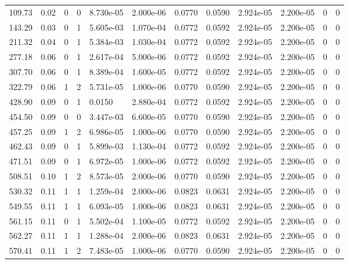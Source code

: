 \documentclass[preview]{standalone}
\begin{document}
{{\begin{tabular}{L{1.2cm}C{1.2cm} C{0.3cm}C{0.5cm} C{1.4cm}C{1.4cm} C{1.4cm}C{1.4cm} C{1.6cm}C{1.6cm} C{1.6cm}C{1.6cm}}
  109.73  &  0.02  & 0     &  0 &  8.730e-05  & 2.000e-06  &  0.0770&   0.0590& 2.924e-05 & 2.200e-05   &  0 & 0  \\ 
  143.29  &  0.03  & 0     &  1 &  5.605e-03  & 1.070e-04  &  0.0772&   0.0592& 2.924e-05 & 2.200e-05   &  0 & 0  \\ 
  211.32  &  0.04  & 0     &  1 &  5.384e-03  & 1.030e-04  &  0.0772&   0.0592& 2.924e-05 & 2.200e-05   &  0 & 0  \\ 
  277.18  &  0.06  & 0     &  1 &  2.617e-04  & 5.000e-06  &  0.0772&   0.0592& 2.924e-05 & 2.200e-05   &  0 & 0  \\ 
  307.70  &  0.06  & 0     &  1 &  8.389e-04  & 1.600e-05  &  0.0772&   0.0592& 2.924e-05 & 2.200e-05   &  0 & 0  \\ 
  322.79  &  0.06  & 1     &  2 &  5.731e-05  & 1.000e-06  &  0.0770&   0.0590& 2.924e-05 & 2.200e-05   &  0 & 0  \\ 
  428.90  &  0.09  & 0     &  1 &  0.0150  & 2.880e-04  &  0.0772&   0.0592& 2.924e-05 & 2.200e-05   &  0 & 0  \\ 
  454.50  &  0.09  & 0     &  0 &  3.447e-03  & 6.600e-05  &  0.0770&   0.0590& 2.924e-05 & 2.200e-05   &  0 & 0  \\ 
  457.25  &  0.09  & 1     &  2 &  6.986e-05  & 1.000e-06  &  0.0770&   0.0590& 2.924e-05 & 2.200e-05   &  0 & 0  \\ 
  462.43  &  0.09  & 0     &  1 &  5.899e-03  & 1.130e-04  &  0.0772&   0.0592& 2.924e-05 & 2.200e-05   &  0 & 0  \\ 
  471.51  &  0.09  & 0     &  1 &  6.972e-05  & 1.000e-06  &  0.0772&   0.0592& 2.924e-05 & 2.200e-05   &  0 & 0  \\ 
  508.51  &  0.10  & 1     &  2 &  8.573e-05  & 2.000e-06  &  0.0770&   0.0590& 2.924e-05 & 2.200e-05   &  0 & 0  \\ 
  530.32  &  0.11  & 1     &  1 &  1.259e-04  & 2.000e-06  &  0.0823&   0.0631& 2.924e-05 & 2.200e-05   &  0 & 0  \\ 
  549.55  &  0.11  & 1     &  1 &  6.093e-05  & 1.000e-06  &  0.0823&   0.0631& 2.924e-05 & 2.200e-05   &  0 & 0  \\ 
  561.15  &  0.11  & 0     &  1 &  5.502e-04  & 1.100e-05  &  0.0772&   0.0592& 2.924e-05 & 2.200e-05   &  0 & 0  \\ 
  562.27  &  0.11  & 1     &  1 &  1.288e-04  & 2.000e-06  &  0.0823&   0.0631& 2.924e-05 & 2.200e-05   &  0 & 0  \\ 
  570.41  &  0.11  & 1     &  2 &  7.483e-05  & 1.000e-06  &  0.0770&   0.0590& 2.924e-05 & 2.200e-05   &  0 & 0  \\ 

\end{tabular}}}
\end{document}

